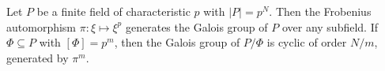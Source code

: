 Let $P$ be a finite field of characteristic $p$ with $|P| = p^N$. Then the Frobenius automorphism $\pi: \xi \mapsto \xi^p$ generates the Galois group of $P$ over any subfield. If $\Phi \subseteq P$ with $[\Phi] = p^m$, then the Galois group of $P/\Phi$ is cyclic of order $N/m$, generated by $\pi^m$.
